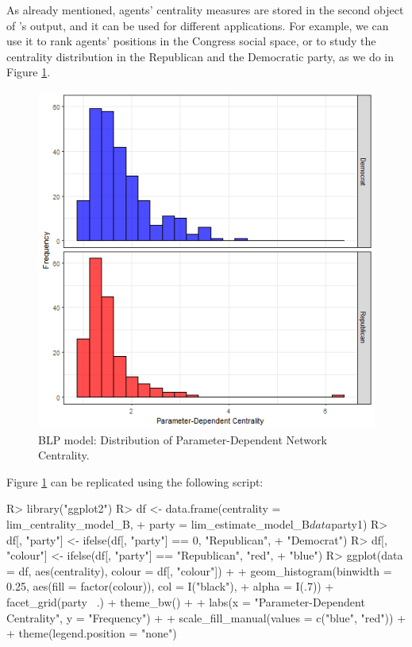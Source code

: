 \documentclass[nojss]{jss}
\begin{document}
	As already mentioned, agents' centrality measures are stored in the second object of 's output, and it can be used for different applications. For example, we can use it to rank agents' positions in the Congress social space, or to study the centrality distribution in the Republican and the Democratic party, as we do in Figure \ref{fig:figure1}. 
	\begin{figure}[t!]
		\centering
		\includegraphics{Figure1}
		\caption{\label{fig:figure1} BLP model: Distribution of Parameter-Dependent Network Centrality.}
	\end{figure}
	Figure \ref{fig:figure1} can be replicated using the following script:
	\begin{CodeChunk}
		\begin{CodeInput}
			R> library("ggplot2")
			R> df <- data.frame(centrality = lim_centrality_model_B,
			+    party = lim_estimate_model_B$data$party1)
			R> df[, "party"] <- ifelse(df[, "party"] == 0, "Republican", 
			+    "Democrat")
			R> df[, "colour"] <- ifelse(df[, "party"] == "Republican", "red", 
			+    "blue")
			R> ggplot(data = df, aes(centrality), colour = df[, "colour"]) + 
			+    geom_histogram(binwidth = 0.25, aes(fill = factor(colour)), col = I("black"),
			+    alpha = I(.7)) + facet_grid(party ~.) + theme_bw() + 
			+    labs(x = "Parameter-Dependent Centrality", y = "Frequency") +
			+    scale_fill_manual(values = c("blue", "red")) + 
			+    theme(legend.position = "none")
		\end{CodeInput}
	\end{CodeChunk}
\end{document}
